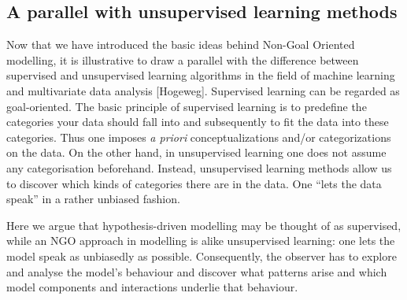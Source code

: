 \subsection{A parallel with unsupervised learning methods}

Now that we have introduced the basic ideas behind Non-Goal Oriented modelling, it is illustrative to draw a parallel with the difference between supervised and unsupervised learning algorithms in the field of machine learning and multivariate data analysis [Hogeweg]. Supervised learning can be regarded as goal-oriented. The basic principle of supervised learning is to predefine the categories your data should fall into and subsequently to fit the data into these categories. Thus one imposes \emph{a priori} conceptualizations and/or categorizations on the data. On the other hand, in unsupervised learning one does not assume any categorisation beforehand. Instead, unsupervised learning methods allow us to discover which kinds of categories there are in the data. One ``lets the data speak'' in a rather unbiased fashion. 

Here we argue that hypothesis-driven modelling may be thought of as supervised, while an NGO approach in modelling is alike unsupervised learning: one lets the model speak as unbiasedly as possible. Consequently, the observer has to explore and analyse the model’s behaviour and discover what patterns arise and which model components and interactions underlie that behaviour.